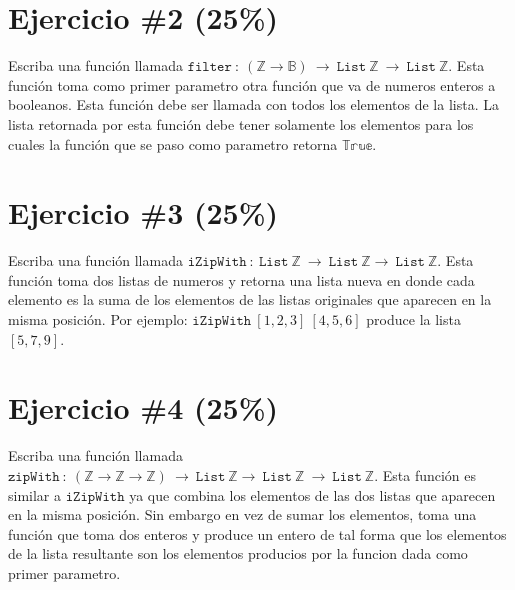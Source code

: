 \documentclass{article}
\begin{document}
\section*{Ejercicio \#2 (25\%)}

Escriba una funci\'on llamada $\mathtt{filter}\ :\ (\mathbb{Z}\rightarrow\mathbb{B})
\ \rightarrow\ \mathtt{List}\ \mathbb{Z}\ \rightarrow\ \mathtt{List}\ \mathbb{Z}$. Esta funci\'on toma
como primer parametro otra funci\'on que va de numeros enteros a booleanos. Esta
funci\'on debe ser llamada con todos los elementos de la lista. La lista retornada
por esta funci\'on debe tener solamente los elementos para los cuales la funci\'on
que se paso como parametro retorna $\mathbb{True}$.

\section*{Ejercicio \#3 (25\%)}

Escriba una funci\'on llamada $\mathtt{iZipWith}\ :\ \mathtt{List}\ \mathbb{Z}\ \rightarrow\ \mathtt{List}\ \mathbb{Z}
\rightarrow\ \mathtt{List}\ \mathbb{Z}$. Esta funci\'on toma dos listas de numeros y retorna
una lista nueva en donde cada elemento es la suma de los elementos de las listas
originales que aparecen en la misma posici\'on. Por ejemplo: $\mathtt{iZipWith}\ [1,2,3]\ 
[4,5,6]$ produce la lista $[5,7,9]$.

\section*{Ejercicio \#4 (25\%)}

Escriba una funci\'on llamada $\mathtt{zipWith}\ :\ (\mathbb{Z}\rightarrow\mathbb{Z}\rightarrow\mathbb{Z})\ 
\rightarrow\ \mathtt{List}\ \mathbb{Z}\rightarrow\ \mathtt{List}\ \mathbb{Z}\ \rightarrow\ \mathtt{List}\ \mathbb{Z}$. Esta
funci\'on es similar a $\mathtt{iZipWith}$ ya que combina los elementos de las dos
listas que aparecen en la misma posici\'on. Sin embargo en vez de sumar los elementos,
toma una funci\'on que toma dos enteros y produce un entero de tal forma que los
elementos de la lista resultante son los elementos producios por la funcion dada
como primer parametro.
\end{document}
